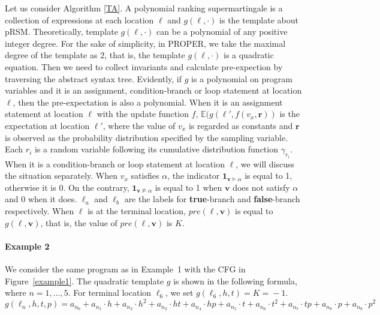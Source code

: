 \documentclass[runningheads]{llncs}
\newcommand\yx[1]{{\color{red} [YD: #1]}}
\begin{document}
Let us consider Algorithm \ref{TA}. A polynomial ranking supermartingale is a collection of expressions at each location $\ell$ and $g(\ell,\cdot)$ is the template about pRSM. Theoretically, template $g(\ell,\cdot)$ can be a polynomial of any positive integer  degree. For the sake of simplicity, in PROPER, we take the maximal degree of the template as $2$, that is, the template $g(\ell,\cdot)$ is a quadratic equation.
Then we need to collect invariants and calculate pre-expection by traversing the abstract syntax tree. Evidently, if $g$ is a polynomial on program variables and it is an assignment, condition-branch or loop statement at location $\ell$, then the pre-expectation is also a polynomial. When it is an assignment statement at location $\ell$ with the update function $f$, $\mathbb{E}(g(\ell',f(v_x,\boldsymbol{r}))$ is the expectation at location $\ell'$, where the value of $v_x$ is regarded as constants and $\boldsymbol{r}$ is observed as the probability distribution specified by the sampling variable. Each $r_i$ is a random variable following its cumulative distribution function $\gamma_{r_i}$.
When it is a condition-branch or loop statement at location $\ell$, we will discuss the situation separately. When $v_x$ satisfies $\alpha$, the indicator $\textbf{1}_{\boldsymbol{v}\vDash\alpha}$ is equal to 1, otherwise it is 0. On the contrary, $\textbf{1}_{\boldsymbol{v}\nvDash\alpha}$ is equal to 1 when $\boldsymbol{v}$ does not satisfy $\alpha$ and 0 when it does. $\ell_a$ and $\ell_b$ are the labels for \textbf{true}-branch and \textbf{false}-branch respectively. When $\ell$ is at the terminal location,  $pre(\ell,\boldsymbol{v})$ is equal to $g(\ell,\boldsymbol{v})$, that is, the value of $pre(\ell,\boldsymbol{v})$ is $K$.

\paragraph{Example 2} 
We consider the same program as in Example~1 with the CFG in Figure~\ref{example1}. The quadratic template $g$ is shown in the following formula, where $n=1,\ldots,5$. For terminal location  $\ell_6$, we set $g(\ell_6,h,t)\!=\!K\!=\!-1$. 
$$g(\!\ell_n,h,t,p\!)\!=\!a_{n_0}\!+\!a_{n_1}\cdot h\!+\!a_{n_2}\cdot h^{2}\!+\!a_{n_3}\cdot ht \!+\!a_{n_4}\cdot hp\!+\!a_{n_5}\cdot t\!+\!a_{n_6}\cdot t^{2}+\!a_{n_7}\cdot tp\!+\!a_{n_8}\cdot p\!+\!a_{n_9}\cdot p^{2}$$ 
\end{document}
